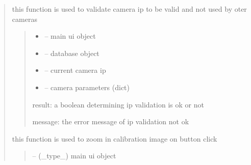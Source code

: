 \documentclass[letterpaper,10pt,english]{sphinxmanual}
\begin{document}
\begin{quote}
\begin{savenotes}\begin{fulllineitems}
\label{\detokenize{setting/backend/camera_funcs:oxin.backend.camera_funcs.validate_camera_ip}}
\pysigstartsignatures
{}
\pysigstopsignatures
\sphinxAtStartPar
this function is used to validate camera ip to be valid and not used by oter cameras
\begin{quote}\begin{description}
\begin{itemize}
\item {} 
\sphinxAtStartPar
{} – main ui object

\item {} 
\sphinxAtStartPar
{} – database object

\item {} 
\sphinxAtStartPar
{} – current camera ip

\item {} 
\sphinxAtStartPar
{} – camera parameters (dict)

\end{itemize}

\sphinxAtStartPar
result: a boolean determining ip validation is ok or not

\sphinxAtStartPar
message: the error message of ip validation not ok

\end{description}\end{quote}

\end{fulllineitems}\end{savenotes}


\begin{savenotes}\begin{fulllineitems}
\label{\detokenize{setting/backend/camera_funcs:oxin.backend.camera_funcs.zoom_in_calibration_image}}
\pysigstartsignatures
{}
\pysigstopsignatures
\sphinxAtStartPar
this function is used to zoom in calibration image on button click
\begin{quote}\begin{description}
\sphinxAtStartPar
{} – (\_type\_) main ui object


\end{description}
\end{quote}
\end{fulllineitems}
\end{savenotes}
\end{quote}
\end{document}
